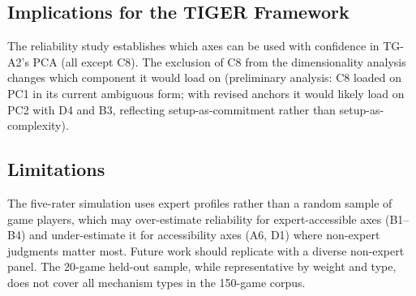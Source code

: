 \subsection{Implications for the TIGER Framework}

The reliability study establishes which axes can be used with confidence in TG-A2's
PCA (all except C8). The exclusion of C8 from the dimensionality analysis
changes which component it would load on (preliminary analysis: C8 loaded on PC1
in its current ambiguous form; with revised anchors it would likely load on PC2
with D4 and B3, reflecting setup-as-commitment rather than setup-as-complexity).

\subsection{Limitations}

The five-rater simulation uses expert profiles rather than a random sample of game players,
which may over-estimate reliability for expert-accessible axes (B1--B4)
and under-estimate it for accessibility axes (A6, D1) where non-expert judgments matter most.
Future work should replicate with a diverse non-expert panel.
The 20-game held-out sample, while representative by weight and type,
does not cover all mechanism types in the 150-game corpus.
